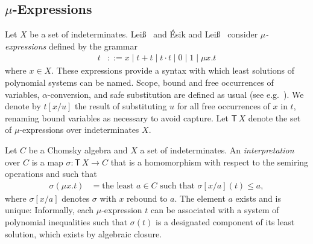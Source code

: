 \documentclass[copyright,creativecommons]{eptcs}
\theoremstyle{remark}
\newcommand\fun{\mathrel\rightarrow}
\newcommand\subst[2]{[#1/#2]}
\newcommand\rebind[2]{[#1/#2]}
\newcommand\mathname[1]{\ensuremath{\mathsf{#1}}}
\newcommand\Tname{\mathname{T}}
\newcommand\T[1]{\Tname\,#1}
\newcommand{\fhcomment}[1]{\textcolor{red}{[\textbf{Comment (FH)}: {#1}]}}
\newcommand{\dkcomment}[1]{\textcolor{blue}{[\textbf{Comment (DK)}: {#1}]}}
\renewcommand{\fhcomment}[1]{}
\renewcommand{\dkcomment}[1]{}
\begin{document}
\subsection{$\mu$-Expressions}
\label{sec:mu-exp}

Let $X$ be a set of indeterminates.
Lei\ss\ \cite{leiss92b} and \'Esik and Lei\ss\ \cite{esle2002,EsikLeiss05} consider \emph{$\mu$-expressions} defined by the grammar
\begin{align*}
t &::= x \mid t + t \mid t \cdot t \mid 0 \mid 1 \mid \mu x. t
\end{align*}
where $x\in X$. These expressions provide a syntax with which least solutions of polynomial systems can be named. Scope, bound and free occurrences of variables, $\alpha$-conversion, and safe substitution are defined as usual (see e.g.\ \cite{Barendregt84}). We denote by $t\subst xu$ the result of substituting $u$ for all free occurrences of $x$ in $t$, renaming bound variables as necessary to avoid capture. Let $\T X$ denote the set of $\mu$-expressions over indeterminates $X$. 

Let $C$ be a Chomsky algebra and $X$ a set of indeterminates.
An \emph{interpretation} over $C$ is a map
\fhcomment{Not a semiring homomorphism, since domain $\T X$ not a semiring.}\dkcomment{OK, how about ``homomorphism with respect to the semiring operators''}\fhcomment{OK.}$\sigma:\T X\fun C$ that is a homomorphism with respect to the semiring operations and 
such that
\begin{align}
\sigma(\mu x. t) &= \text{the least $a\in C$ such that $\sigma\rebind xa(t) \leq a$},\label{ax:mu}
\end{align}
where $\sigma\rebind xa$ denotes $\sigma$ with $x$ rebound to $a$.
The element $a$ exists and is unique: Informally,
each $\mu$-expression $t$ can be associated with a system of polynomial inequalities such that $\sigma(t)$ is a designated component of its least
solution, which exists by algebraic closure.
\fhcomment{Change to: by Beki\'c's Theorem.}\dkcomment{No, it's by algebraic closure. Nothing to do with Beki\'c.}\fhcomment{The $p$ here is from $\T X$, which may contain occurrences of $\mu$.  The definition of algebraic closure only requires least solutions for polynomials from $C[X]$.  Isn't it a bit brief to say that this, existence of least solutions, also holds for $\T X$ by algebraic closure (which I'd read as ``follows immediately from the definition of algebraic closure'')?}
\end{document}
